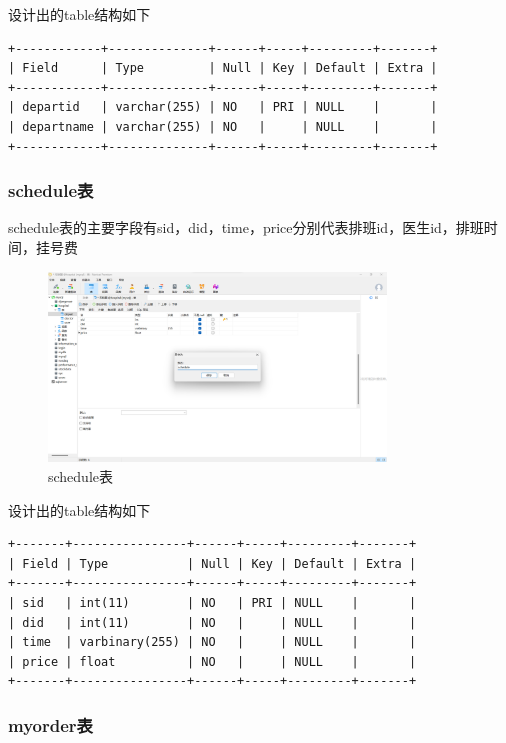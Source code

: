 \documentclass[UTF8,12pt]{article}
\begin{document}
设计出的table结构如下

\begin{lstlisting}[frame=shadowbox]
+------------+--------------+------+-----+---------+-------+
| Field      | Type         | Null | Key | Default | Extra |
+------------+--------------+------+-----+---------+-------+
| departid   | varchar(255) | NO   | PRI | NULL    |       |
| departname | varchar(255) | NO   |     | NULL    |       |
+------------+--------------+------+-----+---------+-------+
\end{lstlisting}

\subsubsection{schedule表}

schedule表的主要字段有sid，did，time，price分别代表排班id，医生id，排班时间，挂号费

\newpage

\begin{figure}[htbp]
    \centering
    \includegraphics[width=0.8\textwidth]{imgs/8.png}
    \caption{schedule表}
\end{figure}

设计出的table结构如下

\begin{lstlisting}[frame=shadowbox]
+-------+----------------+------+-----+---------+-------+
| Field | Type           | Null | Key | Default | Extra |
+-------+----------------+------+-----+---------+-------+
| sid   | int(11)        | NO   | PRI | NULL    |       |
| did   | int(11)        | NO   |     | NULL    |       |
| time  | varbinary(255) | NO   |     | NULL    |       |
| price | float          | NO   |     | NULL    |       |
+-------+----------------+------+-----+---------+-------+
\end{lstlisting}

\subsubsection{myorder表}
\end{document}
